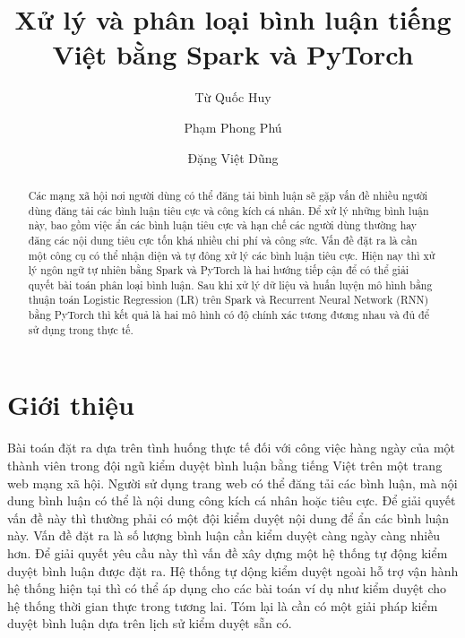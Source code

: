 \documentclass[runningheads]{llncs}
\begin{document}
\title{Xử lý và phân loại bình luận tiếng Việt bằng Spark và PyTorch}
\author{Từ Quốc Huy \and Phạm Phong Phú \and Đặng Việt Dũng}	
\maketitle

\begin{abstract}
Các mạng xã hội nơi người dùng có thể đăng tải bình luận sẽ gặp vấn đề nhiều người dùng đăng tải các bình luận tiêu cực và công kích cá nhân. Để xử lý những bình luận này, bao gồm việc ẩn các bình luận tiêu cực và hạn chế các người dùng thường hay đăng các nội dung tiêu cực tốn khá nhiều chi phí và công sức. Vấn đề đặt ra là cần một công cụ có thể nhận diện và tự đông xử lý các bình luận tiêu cực. Hiện nay thì xử lý ngôn ngữ tự nhiên bằng Spark và PyTorch là hai hướng tiếp cận để có thể giải quyết bài toán phân loại bình luận. Sau khi xử lý dữ liệu và huấn luyện mô hình bằng thuận toán Logistic Regression (LR) trên Spark và Recurrent Neural Network (RNN) bằng PyTorch thì kết quả là hai mô hình có độ chính xác tương đương nhau và đủ để sử dụng trong thực tế.

\end{abstract}

\section{Giới thiệu}

Bài toán đặt ra dựa trên tình huống thực tế đối với công việc hàng ngày của một thành viên trong đội ngũ kiểm duyệt bình luận bằng tiếng Việt trên một trang web mạng xã hội. Người sử dụng trang web có thể đăng tải các bình luận, mà nội dung bình luận có thể là nội dung công kích cá nhân hoặc tiêu cực. Để giải quyết vấn đề này thì thường phải có một đội kiểm duyệt nội dung để ẩn các bình luận này. Vấn đề đặt ra là số lượng bình luận cần kiểm duyệt càng ngày càng nhiều hơn. Để giải quyết yêu cầu này thì vấn đề xây dựng một hệ thống tự động kiểm duyệt bình luận được đặt ra. Hệ thống tự dộng kiểm duyệt ngoài hỗ trợ vận hành hệ thống hiện tại thì có thể áp dụng cho các bài toán ví dụ như kiểm duyệt cho hệ thống thời gian thực trong tương lai. Tóm lại là cần có một giải pháp kiểm duyệt bình luận dựa trên lịch sử kiểm duyệt sẵn có.
\end{document}

